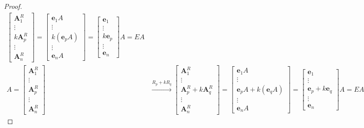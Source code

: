 \begin{proof}
\begin{align*}
\begin{bmatrix}
	\textbf{A}^R_1 \\ \vdots \\ k\textbf{A}^R_p \\ \vdots \\ \textbf{A}^R_n
	\end{bmatrix} = \begin{bmatrix}
	\textbf{e}_1A \\ \vdots \\ k(\textbf{e}_pA) \\ \vdots \\ \textbf{e}_nA
	\end{bmatrix} = \begin{bmatrix}
	\textbf{e}_1 \\ \vdots \\ k\textbf{e}_p \\ \vdots \\ \textbf{e}_n
	\end{bmatrix}A = EA \\
	A = \begin{bmatrix}
	\textbf{A}^R_1 \\ \vdots \\ \textbf{A}^R_p \\ \vdots \\ \textbf{A}^R_n
	\end{bmatrix} &\xrightarrow{R_p + kR_q} \begin{bmatrix}
	\textbf{A}^R_1 \\ \vdots \\ \textbf{A}^R_p + k\textbf{A}^R_q \\ \vdots \\ \textbf{A}^R_n
	\end{bmatrix} = \begin{bmatrix}
	\textbf{e}_1A \\ \vdots \\ \textbf{e}_pA + k(\textbf{e}_qA) \\ \vdots \\ \textbf{e}_nA
	\end{bmatrix} = \begin{bmatrix}
	\textbf{e}_1 \\ \vdots \\ \textbf{e}_p + k\textbf{e}_q \\ \vdots \\ \textbf{e}_n
	\end{bmatrix}A = EA
	\end{align*}
\end{proof}

